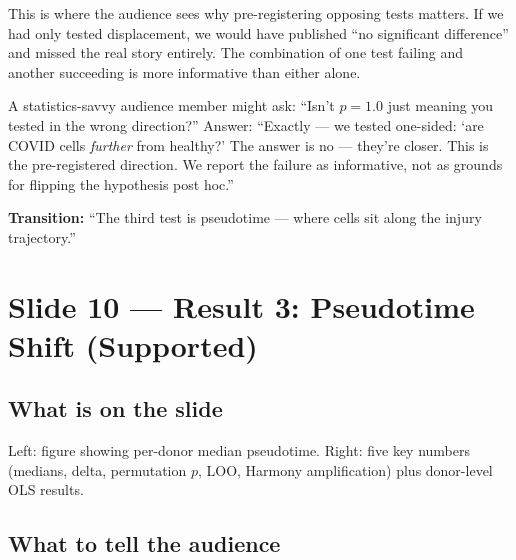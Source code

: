 \documentclass[11pt]{article}
\begin{document}
\begin{whyblock}
This is where the audience sees why pre-registering opposing tests matters. If we had only tested displacement, we would have published ``no significant difference'' and missed the real story entirely. The combination of one test failing and another succeeding is more informative than either alone.
\end{whyblock}

\begin{pitfall}
A statistics-savvy audience member might ask: ``Isn't $p = 1.0$ just meaning you tested in the wrong direction?'' Answer: ``Exactly --- we tested one-sided: `are COVID cells \emph{further} from healthy?' The answer is no --- they're closer. This is the pre-registered direction. We report the failure as informative, not as grounds for flipping the hypothesis post hoc.''
\end{pitfall}

\textbf{Transition:} ``The third test is pseudotime --- where cells sit along the injury trajectory.''


\section{Slide 10 --- Result 3: Pseudotime Shift (Supported)}

\subsection{What is on the slide}

Left: figure showing per-donor median pseudotime. Right: five key numbers (medians, delta, permutation $p$, LOO, Harmony amplification) plus donor-level OLS results.

\subsection{What to tell the audience}
\end{document}

